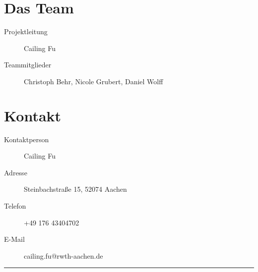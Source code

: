 \documentclass[a4paper,12pt,notumble]{leaflet}
\begin{document}
\newpage

\section{Das Team}
\begin{description}
\item[Projektleitung] Cailing Fu
\item[Teammitglieder] Christoph Behr, Nicole Grubert, Daniel Wolff

\end{description}

\section{Kontakt}
\begin{description}
\item[Kontaktperson] Cailing Fu 
\item[Adresse] Steinbachstraße 15, 52074 Aachen
\item[Telefon] +49 176 43404702
\item[E-Mail] cailing.fu@rwth-aachen.de
\end{description}

\textcolor{rwth-lblue}{\noindent\rule{\textwidth}{4pt}}
\end{document}
